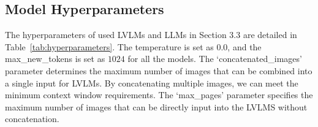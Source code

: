 \subsection{Model Hyperparameters}
\label{appendix: Hyperparameters}
The hyperparameters of used LVLMs and LLMs in Section 3.3 are detailed in Table~\ref{tab:hyperparameters}. The temperature is set as $0.0$, and the max\_new\_tokens is set as $1024$ for all the models. The `concatenated\_images' parameter determines the maximum number of images that can be combined into a single input for LVLMs. By concatenating multiple images, we can meet the minimum context window requirements. The `max\_pages' parameter specifies the maximum number of images that can be directly input into the LVLMS without concatenation.

\begin{table}[!htbp]
    \centering
\end{table}
